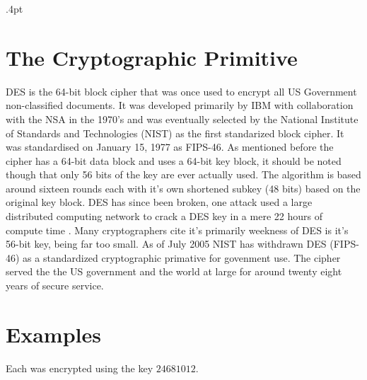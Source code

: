 \documentclass[10pt]{article}
\begin{document}
\maketitle


\newpage

\columnseprule .4pt



\def \columnseprulecolor{ \color{light-gray} }

\section{The Cryptographic Primitive}

\indent DES\cite{spec} is the 64-bit block cipher that was once used to encrypt all US Government 
  non-classified documents.  It was developed primarily by IBM with collaboration with the NSA
  in the 1970's and was eventually selected by the National Institute of Standards   
  and Technologies (NIST) as the first standarized block cipher.
  It was standardised on January 15, 1977 as FIPS-46. As mentioned 
  before the cipher has a 64-bit data block and uses a 64-bit key block, it should be 
  noted though that only 56 bits of the key are ever actually used. The algorithm is 
  based around sixteen rounds each with it's own shortened subkey (48 bits) based on 
  the original key block. DES has since been broken, one attack used a large distributed computing network
  to crack a DES key in a mere 22 hours of compute time \cite{deepcrack}. Many cryptographers cite
  it's primarily weekness of DES is it's 56-bit key, being far too small. 
  As of July 2005 NIST has withdrawn DES (FIPS-46) as a standardized
  cryptographic primative for govenment use\cite{withdrawn}. The cipher served the the US government
  and the world at large for around twenty eight years of secure service. 

\section{Examples}
Each was encrypted using the key $24681012$.
\end{document}
